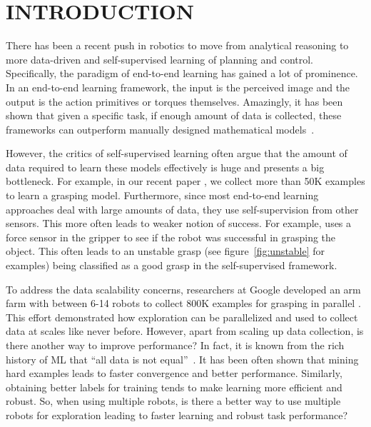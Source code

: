 \documentclass[letterpaper, 10 pt, conference]{ieeeconf}  %
\begin{document}
\vspace{0.2in}\section{INTRODUCTION}
There has been a recent push in robotics to move from analytical reasoning to more data-driven and self-supervised learning of planning and control. Specifically, the paradigm of end-to-end learning has gained a lot of prominence. In an end-to-end learning framework, the input is the perceived image and the output is the action primitives or torques themselves. Amazingly, it has been shown that given a specific task, if enough amount of data is collected, these frameworks can outperform manually designed mathematical models~\cite{lenz2015deep, pinto2016supersizing, levine2016end, levine2016learning}.

However, the critics of self-supervised learning often argue that the amount of data required to learn these models effectively is huge and presents a big bottleneck. For example, in our recent paper \cite{pinto2016supersizing}, we collect more than 50K examples to learn a grasping model. Furthermore, since most end-to-end learning approaches deal with large amounts of data, they use self-supervision from other sensors. This more often leads to weaker notion of success. For example, \cite{pinto2016supersizing} uses a force sensor in the gripper to see if the robot was successful in grasping the object. This often leads to an unstable grasp (see figure~\ref{fig:unstable} for examples) being classified as a good grasp in the self-supervised framework. 

To address the data scalability concerns, researchers at Google developed an arm farm with between 6-14 robots to collect 800K examples for grasping in parallel \cite{levine2016learning}. This  effort demonstrated how exploration can be parallelized and used to collect data at scales like never before. However, apart from scaling up data collection, is there another way to improve performance? In fact, it is known from the rich history of ML that ``all data is not equal''~\cite{sung1994learning, rowley1998neural}. It has been often shown that mining hard examples leads to faster convergence and better performance. Similarly, obtaining better labels for training tends to make learning more efficient and robust. So, when using multiple robots, is there a better way to use multiple robots for exploration leading to faster learning and robust task performance? 
\end{document}
